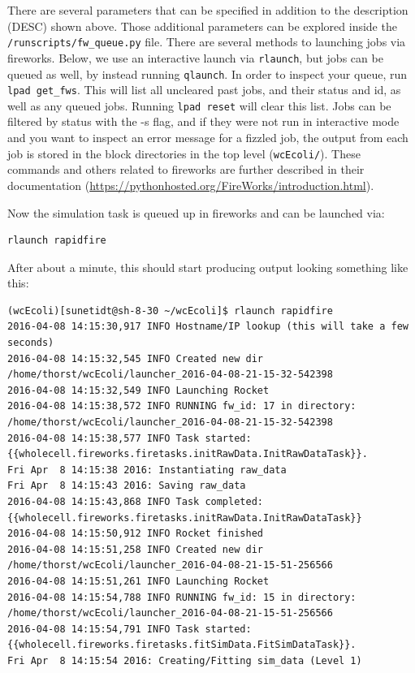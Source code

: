 \documentclass[12pt]{article}
\begin{document}
There are several parameters that can be specified in addition to the description (DESC) shown above. Those additional parameters can be explored inside the \texttt{/runscripts/fw_queue.py} file. There are several methods to launching jobs via fireworks. Below, we use an interactive launch via \texttt{rlaunch}, but jobs can be queued as well, by instead running \texttt{qlaunch}. In order to inspect your queue, run \texttt{lpad get_fws}. This will list all uncleared past jobs, and their status and id, as well as any queued jobs.  Running \texttt{lpad reset} will clear this list. Jobs can be filtered by status with the -s flag, and if they were not run in interactive mode and you want to inspect an error message for a fizzled job, the output from each job is stored in the block directories in the top level (\texttt{wcEcoli/}). These commands and others related to fireworks are further described in their documentation (\url{https://pythonhosted.org/FireWorks/introduction.html}). 

Now the simulation task is queued up in fireworks and can be launched via:

\begin{lstlisting}
rlaunch rapidfire
\end{lstlisting}

After about a minute, this should start producing output looking something like this:

\begin{lstlisting}
(wcEcoli)[sunetidt@sh-8-30 ~/wcEcoli]$ rlaunch rapidfire
2016-04-08 14:15:30,917 INFO Hostname/IP lookup (this will take a few seconds)
2016-04-08 14:15:32,545 INFO Created new dir /home/thorst/wcEcoli/launcher_2016-04-08-21-15-32-542398
2016-04-08 14:15:32,549 INFO Launching Rocket
2016-04-08 14:15:38,572 INFO RUNNING fw_id: 17 in directory: /home/thorst/wcEcoli/launcher_2016-04-08-21-15-32-542398
2016-04-08 14:15:38,577 INFO Task started: {{wholecell.fireworks.firetasks.initRawData.InitRawDataTask}}.
Fri Apr  8 14:15:38 2016: Instantiating raw_data
Fri Apr  8 14:15:43 2016: Saving raw_data
2016-04-08 14:15:43,868 INFO Task completed: {{wholecell.fireworks.firetasks.initRawData.InitRawDataTask}} 
2016-04-08 14:15:50,912 INFO Rocket finished
2016-04-08 14:15:51,258 INFO Created new dir /home/thorst/wcEcoli/launcher_2016-04-08-21-15-51-256566
2016-04-08 14:15:51,261 INFO Launching Rocket
2016-04-08 14:15:54,788 INFO RUNNING fw_id: 15 in directory: /home/thorst/wcEcoli/launcher_2016-04-08-21-15-51-256566
2016-04-08 14:15:54,791 INFO Task started: {{wholecell.fireworks.firetasks.fitSimData.FitSimDataTask}}.
Fri Apr  8 14:15:54 2016: Creating/Fitting sim_data (Level 1)
 \end{lstlisting}
\end{document}
